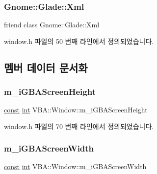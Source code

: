 \subsubsection{\texorpdfstring{Gnome\+::\+Glade\+::\+Xml}{Gnome::Glade::Xml}}
{\footnotesize\ttfamily friend class Gnome\+::\+Glade\+::\+Xml\hspace{0.3cm}{\ttfamily [friend]}}



window.\+h 파일의 50 번째 라인에서 정의되었습니다.



\subsection{멤버 데이터 문서화}
\mbox{\label{class_v_b_a_1_1_window_a5029d02ff8ee7d81fa7e9ad210d537d6}} 
\subsubsection{\texorpdfstring{m\+\_\+i\+G\+B\+A\+Screen\+Height}{m\_iGBAScreenHeight}}
{\footnotesize\ttfamily \mbox{\hyperlink{getopt1_8c_a2c212835823e3c54a8ab6d95c652660e}{const}} \mbox{\hyperlink{_util_8cpp_a0ef32aa8672df19503a49fab2d0c8071}{int}} V\+B\+A\+::\+Window\+::m\+\_\+i\+G\+B\+A\+Screen\+Height}



window.\+h 파일의 70 번째 라인에서 정의되었습니다.

\mbox{\label{class_v_b_a_1_1_window_a9a7257c8edba5383674c7a7eea250679}} 
\subsubsection{\texorpdfstring{m\+\_\+i\+G\+B\+A\+Screen\+Width}{m\_iGBAScreenWidth}}
{\footnotesize\ttfamily \mbox{\hyperlink{getopt1_8c_a2c212835823e3c54a8ab6d95c652660e}{const}} \mbox{\hyperlink{_util_8cpp_a0ef32aa8672df19503a49fab2d0c8071}{int}} V\+B\+A\+::\+Window\+::m\+\_\+i\+G\+B\+A\+Screen\+Width}



